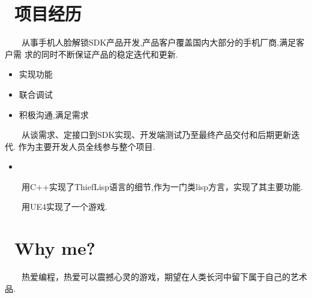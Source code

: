 \documentclass{resume}
\begin{document}
\section{\faUsers\ 项目经历}
\begin{onehalfspacing}
\ \ \ \ 从事手机人脸解锁SDK产品开发,产品客户覆盖国内大部分的手机厂商,满足客户需
求的同时不断保证产品的稳定迭代和更新.
\begin{itemize}
  \item 实现功能
  \item 联合调试
  \item 积极沟通,满足需求
\end{itemize}
\end{onehalfspacing}

\begin{onehalfspacing}
  \ \ \ \ 从谈需求、定接口到SDK实现、开发端测试乃至最终产品交付和后期更新迭代.
  作为主要开发人员全线参与整个项目.

\begin{itemize}
  \item
\end{itemize}
\end{onehalfspacing}

\begin{onehalfspacing}
\ \ \ \ 用C++实现了ThiefLisp语言的细节,作为一门类lisp方言，实现了其主要功能.
\end{onehalfspacing}

\begin{onehalfspacing}
\ \ \ \ 用UE4实现了一个游戏.
\end{onehalfspacing}


\section{\faHeartO\ Why me?}
\ \ \ \ 热爱编程，热爱可以震撼心灵的游戏，期望在人类长河中留下属于自己的艺术品.

%
%
\end{document}
